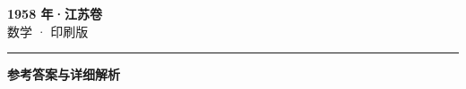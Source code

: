 \documentclass[zihao=5, a4paper]{ctexart}
\begin{document}
\begin{center}
  {\Large\bfseries 1958 年·江苏卷}\\[4pt]
  {\large 数学 · 印刷版}
\end{center}
\medskip
{}

\par\bigskip\hrule\bigskip
{}
\begin{center}{\large\bfseries 参考答案与详细解析}\end{center}
\smallskip

\end{document}
